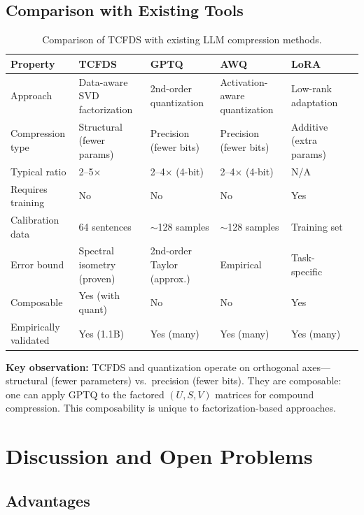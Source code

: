 \documentclass[11pt,a4paper]{article}
\begin{document}
\subsection{Comparison with Existing Tools}

\begin{table}[h]
\centering
\caption{Comparison of TCFDS with existing LLM compression methods.}
\small
\begin{tabular}{@{}p{2.5cm}p{2.5cm}p{2cm}p{2cm}p{2cm}p{2cm}@{}}
\toprule
\textbf{Property} & \textbf{TCFDS} & \textbf{GPTQ} & \textbf{AWQ} & \textbf{LoRA} \\
\midrule
Approach & Data-aware SVD factorization & 2nd-order quantization & Activation-aware quantization & Low-rank adaptation \\[4pt]
Compression type & Structural (fewer params) & Precision (fewer bits) & Precision (fewer bits) & Additive (extra params) \\[4pt]
Typical ratio & 2--5$\times$ & 2--4$\times$ (4-bit) & 2--4$\times$ (4-bit) & N/A \\[4pt]
Requires training & No & No & No & Yes \\[4pt]
Calibration data & 64 sentences & $\sim$128 samples & $\sim$128 samples & Training set \\[4pt]
Error bound & Spectral isometry (proven) & 2nd-order Taylor (approx.) & Empirical & Task-specific \\[4pt]
Composable & Yes (with quant) & No & No & Yes \\[4pt]
Empirically validated & Yes (1.1B) & Yes (many) & Yes (many) & Yes (many) \\
\bottomrule
\end{tabular}
\label{tab:comparison}
\end{table}

\textbf{Key observation:} TCFDS and quantization operate on orthogonal axes---structural (fewer parameters) vs.\ precision (fewer bits). They are composable: one can apply GPTQ to the factored $(U, S, V)$ matrices for compound compression. This composability is unique to factorization-based approaches.

\section{Discussion and Open Problems}

\subsection{Advantages}
\end{document}
